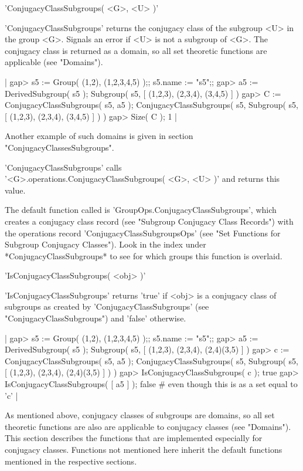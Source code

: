 'ConjugacyClassSubgroups( <G>, <U> )'

'ConjugacyClassSubgroups' returns the conjugacy class of the subgroup <U>
in the group <G>.  Signals an error if <U> is not a subgroup of <G>.  The
conjugacy class is returned as  a domain, so all set  theoretic functions
are applicable (see "Domains").

|    gap> s5 := Group( (1,2), (1,2,3,4,5) );;  s5.name := "s5";;
    gap> a5 := DerivedSubgroup( s5 );
    Subgroup( s5, [ (1,2,3), (2,3,4), (3,4,5) ] )
    gap> C := ConjugacyClassSubgroups( s5, a5 );
    ConjugacyClassSubgroups( s5, Subgroup( s5, 
    [ (1,2,3), (2,3,4), (3,4,5) ] ) )
    gap> Size( C );
    1 |

Another example of such domains is given in section
"ConjugacyClassesSubgroups".

'ConjugacyClassSubgroups' calls \\
'<G>.operations.ConjugacyClassSubgroups( <G>, <U> )'
and returns this value.

The default function called  is 'GroupOps.ConjugacyClassSubgroups', which
creates a conjugacy class record (see "Subgroup Conjugacy Class Records")
with   the   operations  record  'ConjugacyClassSubgroupsOps'  (see  "Set
Functions for  Subgroup Conjugacy  Classes").   Look  in the index  under
*ConjugacyClassSubgroups*  to see  for  which  groups  this  function  is
overlaid.


'IsConjugacyClassSubgroups( <obj> )'

'IsConjugacyClassSubgroups' returns 'true' if <obj> is a  conjugacy class
of   subgroups    as    created    by    'ConjugacyClassSubgroups'   (see
"ConjugacyClassSubgroups") and 'false' otherwise.

|    gap> s5 := Group( (1,2), (1,2,3,4,5) );;  s5.name := "s5";;
    gap> a5 := DerivedSubgroup( s5 );
    Subgroup( s5, [ (1,2,3), (2,3,4), (2,4)(3,5) ] )
    gap> c := ConjugacyClassSubgroups( s5, a5 );
    ConjugacyClassSubgroups( s5, Subgroup( s5, 
    [ (1,2,3), (2,3,4), (2,4)(3,5) ] ) )
    gap> IsConjugacyClassSubgroups( c );
    true
    gap> IsConjugacyClassSubgroups( [ a5 ] );
    false    # even though this is as a set equal to 'c' |


As mentioned  above,  conjugacy classes of subgroups  are domains, so all
set theoretic functions are also are applicable to conjugacy classes (see
"Domains").  This section  describes the  functions that  are implemented
especially  for conjugacy  classes.  Functions not mentioned here inherit
the default functions mentioned in the respective sections.

